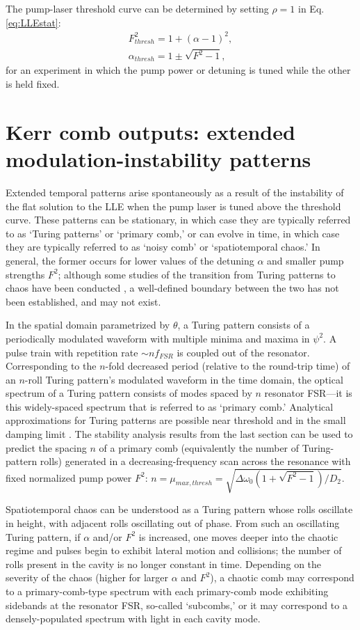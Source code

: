 {The pump-laser threshold curve can be determined by setting $\rho=1$ in Eq. \ref{eq:LLEstat}: 
\begin{align}
F^2_{thresh}=1+(\alpha-1)^2, \\
\alpha_{thresh}=1\pm\sqrt{F^2-1},
\end{align} 
for an experiment in which the pump power or detuning is tuned while the other is held fixed. 



\section{Kerr comb outputs: extended modulation-instability patterns}

Extended temporal patterns arise spontaneously as a result of the instability of the flat solution to the LLE when the pump laser is tuned above the threshold curve. These patterns can be stationary, in which case they are typically referred to as `Turing patterns' or `primary comb,' or can evolve in time, in which case they are typically referred to as `noisy comb' or `spatiotemporal chaos.' In general, the former occurs for lower values of the detuning $\alpha$ and smaller pump strengths $F^2$; although some studies of the transition from Turing patterns to chaos have been conducted \cite{Coillet2014,others}, a well-defined boundary between the two has not been established, and may not exist. 

In the spatial domain parametrized by $\theta$, a Turing pattern consists of a periodically modulated waveform with multiple minima and maxima in $\psi^2$. A pulse train with repetition rate $\sim n f_{FSR}$ is coupled out of the resonator. Corresponding to the $n$-fold decreased period (relative to the round-trip time) of an $n$-roll Turing pattern's modulated waveform in the time domain, the optical spectrum of a Turing pattern consists of modes spaced by $n$ resonator FSR---it is this widely-spaced spectrum that is referred to as `primary comb.'  Analytical approximations for Turing patterns are possible near threshold \cite{Lugiato1987,Lugiato1987a} and in the small damping limit \cite{Renninger2016}. The stability analysis results from the last section can be used to predict the spacing $n$ of a primary comb (equivalently the number of Turing-pattern rolls) generated in a decreasing-frequency scan across the resonance with fixed normalized pump power $F^2$: $n=\mu_{max,thresh}=\sqrt{\Delta\omega_0(1+\sqrt{F^2-1})/D_2}$.

Spatiotemporal chaos can be understood as a Turing pattern whose rolls oscillate in height, with adjacent rolls oscillating out of phase. From such an oscillating Turing pattern, if $\alpha$ and/or $F^2$ is increased, one moves deeper into the chaotic regime and pulses begin to exhibit lateral motion and collisions; the number of rolls present in the cavity is no longer constant in time. Depending on the severity of the chaos (higher for larger $\alpha$ and $F^2$), a chaotic comb may correspond to a primary-comb-type spectrum with each primary-comb mode exhibiting sidebands at the resonator FSR, so-called `subcombs,' or it may correspond to a densely-populated spectrum with light in each cavity mode.

}
